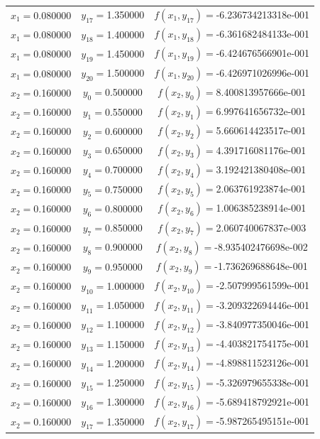 \begin{longtable}{ccc}
$x_{1}=$0.080000 & $y_{17}=$1.350000 & $f(x_{1},y_{17})=$-6.236734213318e-001 \\
$x_{1}=$0.080000 & $y_{18}=$1.400000 & $f(x_{1},y_{18})=$-6.361682484133e-001 \\
$x_{1}=$0.080000 & $y_{19}=$1.450000 & $f(x_{1},y_{19})=$-6.424676566901e-001 \\
$x_{1}=$0.080000 & $y_{20}=$1.500000 & $f(x_{1},y_{20})=$-6.426971026996e-001 \\
$x_{2}=$0.160000 & $y_{0}=$0.500000 & $f(x_{2},y_{0})=$8.400813957666e-001 \\
$x_{2}=$0.160000 & $y_{1}=$0.550000 & $f(x_{2},y_{1})=$6.997641656732e-001 \\
$x_{2}=$0.160000 & $y_{2}=$0.600000 & $f(x_{2},y_{2})=$5.660614423517e-001 \\
$x_{2}=$0.160000 & $y_{3}=$0.650000 & $f(x_{2},y_{3})=$4.391716081176e-001 \\
$x_{2}=$0.160000 & $y_{4}=$0.700000 & $f(x_{2},y_{4})=$3.192421380408e-001 \\
$x_{2}=$0.160000 & $y_{5}=$0.750000 & $f(x_{2},y_{5})=$2.063761923874e-001 \\
$x_{2}=$0.160000 & $y_{6}=$0.800000 & $f(x_{2},y_{6})=$1.006385238914e-001 \\
$x_{2}=$0.160000 & $y_{7}=$0.850000 & $f(x_{2},y_{7})=$2.060740067837e-003 \\
$x_{2}=$0.160000 & $y_{8}=$0.900000 & $f(x_{2},y_{8})=$-8.935402476698e-002 \\
$x_{2}=$0.160000 & $y_{9}=$0.950000 & $f(x_{2},y_{9})=$-1.736269688648e-001 \\
$x_{2}=$0.160000 & $y_{10}=$1.000000 & $f(x_{2},y_{10})=$-2.507999561599e-001 \\
$x_{2}=$0.160000 & $y_{11}=$1.050000 & $f(x_{2},y_{11})=$-3.209322694446e-001 \\
$x_{2}=$0.160000 & $y_{12}=$1.100000 & $f(x_{2},y_{12})=$-3.840977350046e-001 \\
$x_{2}=$0.160000 & $y_{13}=$1.150000 & $f(x_{2},y_{13})=$-4.403821754175e-001 \\
$x_{2}=$0.160000 & $y_{14}=$1.200000 & $f(x_{2},y_{14})=$-4.898811523126e-001 \\
$x_{2}=$0.160000 & $y_{15}=$1.250000 & $f(x_{2},y_{15})=$-5.326979655338e-001 \\
$x_{2}=$0.160000 & $y_{16}=$1.300000 & $f(x_{2},y_{16})=$-5.689418792921e-001 \\
$x_{2}=$0.160000 & $y_{17}=$1.350000 & $f(x_{2},y_{17})=$-5.987265495151e-001 \\

\end{longtable}
